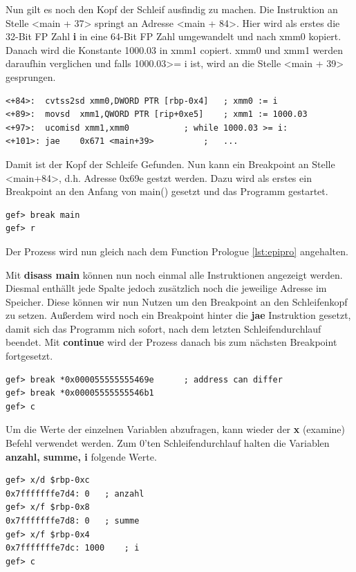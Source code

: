 \documentclass[12pt]{article}
\begin{document}
Nun gilt es noch den Kopf der Schleif ausfindig zu machen. Die Instruktion an Stelle <main + 37> springt an Adresse <main + 84>. Hier wird als erstes die 32-Bit FP Zahl \textbf{i} in eine 64-Bit FP Zahl umgewandelt und nach xmm0 kopiert. Danach wird die Konstante 1000.03 in xmm1 copiert. xmm0 und xmm1 werden daraufhin verglichen und falls 1000.03>= i ist, wird an die Stelle <main + 39> gesprungen.
\begin{lstlisting}
<+84>:	cvtss2sd xmm0,DWORD PTR [rbp-0x4]	; xmm0 := i
<+89>:	movsd  xmm1,QWORD PTR [rip+0xe5]	; xmm1 := 1000.03
<+97>:	ucomisd xmm1,xmm0			; while 1000.03 >= i:
<+101>:	jae    0x671 <main+39>			;	...
\end{lstlisting}
Damit ist der Kopf der Schleife Gefunden. Nun kann ein Breakpoint an Stelle <main+84>, d.h. Adresse 0x69e gestzt werden. Dazu wird als erstes ein Breakpoint an den Anfang von main() gesetzt und das Programm gestartet.
\begin{lstlisting}
gef> break main
gef> r
\end{lstlisting}
Der Prozess wird nun gleich nach dem Function Prologue \ref{lst:epipro} angehalten. 


Mit \textbf{disass main} können nun noch einmal alle Instruktionen angezeigt werden. Diesmal enthällt jede Spalte jedoch zusätzlich noch die jeweilige Adresse im Speicher. Diese können wir nun Nutzen um den Breakpoint an den Schleifenkopf zu setzen. Außerdem wird noch ein Breakpoint hinter die \textbf{jae} Instruktion gesetzt, damit sich das Programm nich sofort, nach dem letzten Schleifendurchlauf beendet. Mit \textbf{continue} wird der Prozess danach bis zum nächsten Breakpoint fortgesetzt.
\begin{lstlisting}
gef> break *0x000055555555469e		; address can differ
gef> break *0x00005555555546b1
gef> c
\end{lstlisting}


Um die Werte der einzelnen Variablen abzufragen, kann wieder der \textbf{x} (examine) Befehl verwendet werden. Zum 0'ten Schleifendurchlauf halten die Variablen \textbf{anzahl, summe, i} folgende Werte.

\begin{lstlisting}
gef> x/d $rbp-0xc
0x7fffffffe7d4:	0	; anzahl
gef> x/f $rbp-0x8
0x7fffffffe7d8:	0	; summe
gef> x/f $rbp-0x4
0x7fffffffe7dc:	1000	; i
gef> c
\end{lstlisting}
\end{document}
